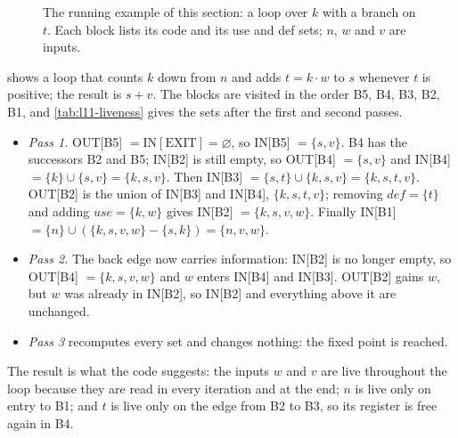 \documentclass[../main.tex]{subfiles}
\begin{document}
\begin{figure}[tb]
  \centering
  
  \caption{The running example of this section: a loop over $k$ with a
    branch on $t$.  Each block lists its code and its use and def sets;
    $n$, $w$ and $v$ are inputs.}
  \label{fig:l11-liveness-cfg}
\end{figure}

\begin{example}
  \label{ex:l11-liveness}
   shows a loop that counts $k$ down from
  $n$ and adds $t = k\cdot w$ to $s$ whenever $t$ is positive; the
  result is $s + v$.  The blocks are visited in the order B5, B4, B3,
  B2, B1, and \cref{tab:l11-liveness} gives the sets after the first
  and second passes.
  \begin{itemize}
    \item \emph{Pass 1.}  OUT[B5] $= \mathrm{IN}[\mathrm{EXIT}] =
      \varnothing$, so IN[B5] $= \{s,v\}$.  B4 has the successors B2
      and B5; IN[B2] is still empty, so OUT[B4] $= \{s,v\}$ and
      IN[B4] $= \{k\} \cup \{s,v\} = \{k,s,v\}$.  Then IN[B3] $=
      \{s,t\} \cup \{k,s,v\} = \{k,s,t,v\}$.  OUT[B2] is the union of
      IN[B3] and IN[B4], $\{k,s,t,v\}$; removing $\mathit{def} =
      \{t\}$ and adding $\mathit{use} = \{k,w\}$ gives IN[B2] $=
      \{k,s,v,w\}$.  Finally IN[B1] $= \{n\} \cup (\{k,s,v,w\} -
      \{s,k\}) = \{n,v,w\}$.
    \item \emph{Pass 2.}  The back edge now carries information: IN[B2]
      is no longer empty, so OUT[B4] $= \{k,s,v,w\}$ and $w$ enters
      IN[B4] and IN[B3].  OUT[B2] gains $w$, but $w$ was already in
      IN[B2], so IN[B2] and everything above it are unchanged.
    \item \emph{Pass 3} recomputes every set and changes nothing: the
      fixed point is reached.
  \end{itemize}
  The result is what the code suggests: the inputs $w$ and $v$ are live
  throughout the loop because they are read in every iteration and at
  the end; $n$ is live only on entry to B1; and $t$ is live only on the
  edge from B2 to B3, so its register is free again in B4.
\end{example}
\end{document}
